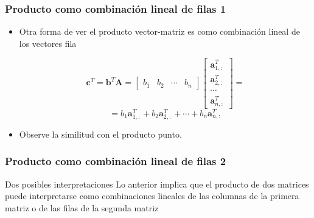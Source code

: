 \documentclass{beamer}
\begin{document}
\begin{frame}
\frametitle{Producto como combinación lineal de filas 1}
\begin{itemize}
\item Otra forma de ver el producto vector-matriz es como combinación lineal de los vectores fila 
 
\begin{equation*}
\boldsymbol{c}^T =\boldsymbol{b}^T\boldsymbol{A}= \begin{bmatrix} b_1  & b_2 & \cdots & b_n   \end{bmatrix} \begin{bmatrix} \boldsymbol{a}_{1,:}^T  \\ \boldsymbol{a}_{2,:}^T \\ \cdots \\ \boldsymbol{a}_{n,:}^T   \end{bmatrix}= 
\end{equation*}
\begin{equation*}
=b_1\boldsymbol{a}_{1,:}^T +b_2\boldsymbol{a}_{2,:}^T+\cdots+b_n\boldsymbol{a}_{n,:}^T
\end{equation*}

\item Observe la similitud con el producto punto.
\end{itemize}
\end{frame}
\begin{frame}
\frametitle{Producto como combinación lineal de filas 2}
\begin{theorem}{Dos posibles interpretaciones}
Lo anterior implica que el producto de dos matrices puede interpretarse como combinaciones lineales de las columnas de la primera matriz o de las filas de la segunda matriz
\end{theorem}
\end{frame}
\end{document}

